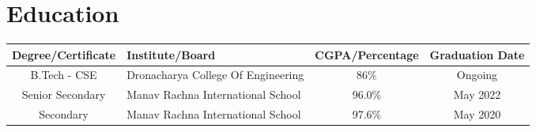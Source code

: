 \documentclass[a4paper,11pt]{article}
\begin{document}

\section{Education}
\vspace{-2mm}
    \setlength{\tabcolsep}{2pt} %
    \small\begin{tabularx}{\textwidth}{|c|Y|c|c|}
      \hline
      \textbf{Degree/Certificate} & \textbf{Institute/Board} & \textbf{CGPA/Percentage} & \textbf{Graduation Date}\\
      \hline
      B.Tech - CSE & Dronacharya College Of Engineering & 86\% & Ongoing\\
      \hline
      Senior Secondary & Manav Rachna International School & 96.0\% & May 2022 \\
      \hline
      Secondary & Manav Rachna International School & 97.6\% & May 2020 \\
      \hline
    \end{tabularx}
\vspace{-5mm}
\end{document}
